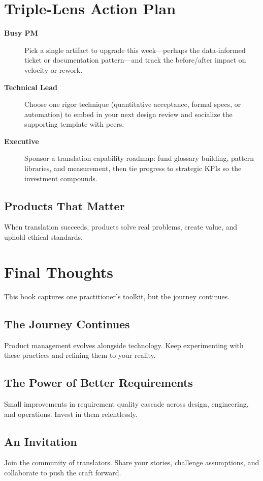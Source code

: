 \section{Triple-Lens Action Plan}
\label{sec:conclusion-triple}

\begin{description}
    \item[\textbf{Busy PM}] Pick a single artifact to upgrade this week—perhaps the data-informed ticket or documentation pattern—and track the before/after impact on velocity or rework.
    \item[\textbf{Technical Lead}] Choose one rigor technique (quantitative acceptance, formal specs, or automation) to embed in your next design review and socialize the supporting template with peers.
    \item[\textbf{Executive}] Sponsor a translation capability roadmap: fund glossary building, pattern libraries, and measurement, then tie progress to strategic KPIs so the investment compounds.
\end{description}

\subsection{Products That Matter}
When translation succeeds, products solve real problems, create value, and uphold ethical standards.

\section{Final Thoughts}
\label{sec:final-thoughts}

This book captures one practitioner's toolkit, but the journey continues.

\subsection{The Journey Continues}
Product management evolves alongside technology. Keep experimenting with these practices and refining them to your reality.

\subsection{The Power of Better Requirements}
Small improvements in requirement quality cascade across design, engineering, and operations. Invest in them relentlessly.

\subsection{An Invitation}
Join the community of translators. Share your stories, challenge assumptions, and collaborate to push the craft forward.

